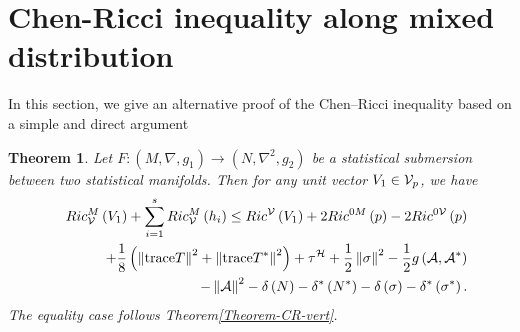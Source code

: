 \documentclass[10pt,a4paper]{article}
\newtheorem{theorem}{Theorem}[section]
\theoremstyle{definition}
\theoremstyle{remark}
\numberwithin{equation}{section}
\begin{document}
\section{Chen-Ricci inequality along mixed distribution}

In this section, we give an alternative proof of the Chen–Ricci inequality based on a simple and direct argument

\begin{theorem}\cite{SiddiquiChenSiddiqi2021}
Let $F:\left( M,\nabla ,g_{1}\right) \rightarrow \left( N,\nabla
^{2},g_{2}\right) $ be a statistical submersion between two statistical
manifolds. Then for any unit vector $V_{1}\in {\cal V}_{p}$, we have%
\begin{eqnarray*}
&&Ric_{{\cal V}}^{M}\left( V_{1}\right) +\sum_{i=1}^{s}Ric_{{\cal V}%
}^{M}\left( h_{i}\right) \leq Ric^{{\cal V}}\left( V_{1}\right)
+2Ric^{0M}\left( p\right) -2Ric^{0{\cal V}}\left( p\right) \\
&&+\frac{1}{8}\left( \left\Vert {\rm trace}T\right\Vert ^{2}+\left\Vert {\rm %
trace}T^{\ast }\right\Vert ^{2}\right) +\tau ^{{\cal H}}+\frac{1}{2}%
\left\Vert \sigma \right\Vert ^{2}-\frac{1}{2}g\left( {\cal A},{\cal A}%
^{\ast }\right) \\
&&-\left\Vert {\cal A}\right\Vert ^{2}-\delta \left( N\right) -\delta ^{\ast
}\left( N^{\ast }\right) -\delta \left( \sigma \right) -\delta ^{\ast
}\left( \sigma ^{\ast }\right) .
\end{eqnarray*}%
The equality case follows Theorem\ref{Theorem-CR-vert}.
\end{theorem}
\end{document}
